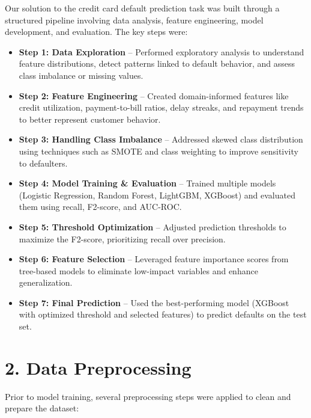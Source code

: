 \documentclass{article}
\begin{document}
Our solution to the credit card default prediction task was built through a structured pipeline involving data analysis, feature engineering, model development, and evaluation. The key steps were:

\begin{itemize}
    \item \textbf{Step 1: Data Exploration} – Performed exploratory analysis to understand feature distributions, detect patterns linked to default behavior, and assess class imbalance or missing values.
    
    \item \textbf{Step 2: Feature Engineering} – Created domain-informed features like credit utilization, payment-to-bill ratios, delay streaks, and repayment trends to better represent customer behavior.
    
    \item \textbf{Step 3: Handling Class Imbalance} – Addressed skewed class distribution using techniques such as SMOTE and class weighting to improve sensitivity to defaulters.
    
    \item \textbf{Step 4: Model Training \& Evaluation} – Trained multiple models (Logistic Regression, Random Forest, LightGBM, XGBoost) and evaluated them using recall, F2-score, and AUC-ROC.
    
    \item \textbf{Step 5: Threshold Optimization} – Adjusted prediction thresholds to maximize the F2-score, prioritizing recall over precision.
    
    \item \textbf{Step 6: Feature Selection} – Leveraged feature importance scores from tree-based models to eliminate low-impact variables and enhance generalization.
    
    \item \textbf{Step 7: Final Prediction} – Used the best-performing model (XGBoost with optimized threshold and selected features) to predict defaults on the test set.
\end{itemize}

\section*{2. Data Preprocessing}

Prior to model training, several preprocessing steps were applied to clean and prepare the dataset:
\end{document}
